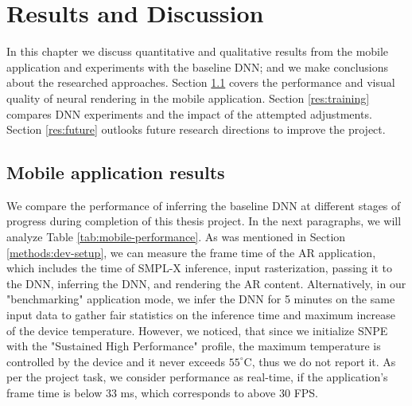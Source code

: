 \chapter{Results and Discussion}\label{chapter:res}
In this chapter we discuss quantitative and qualitative results from the mobile application and experiments with the baseline DNN; and we make conclusions about the researched approaches. Section \ref{res:performance} covers the performance and visual quality of neural rendering in the mobile application. Section \ref{res:training} compares DNN experiments and the impact of the attempted adjustments. Section \ref{res:future} outlooks future research directions to improve the project.

\section{Mobile application results}\label{res:performance}

We compare the performance of inferring the baseline DNN at different stages of progress during completion of this thesis project. In the next paragraphs, we will analyze Table \ref{tab:mobile-performance}. As was mentioned in Section \ref{methods:dev-setup}, we can measure the frame time of the AR application, which includes the time of SMPL-X inference, input rasterization, passing it to the DNN, inferring the DNN, and rendering the AR content. Alternatively, in our "benchmarking" application mode, we infer the DNN for 5 minutes on the same input data to gather fair statistics on the inference time and maximum increase of the device temperature. However, we noticed, that since we initialize SNPE with the "Sustained High Performance" profile, the maximum temperature is controlled by the device and it never exceeds $55^\circ$C, thus we do not report it. As per the project task, we consider performance as real-time, if the application's frame time is below 33 ms, which corresponds to above 30 FPS.

